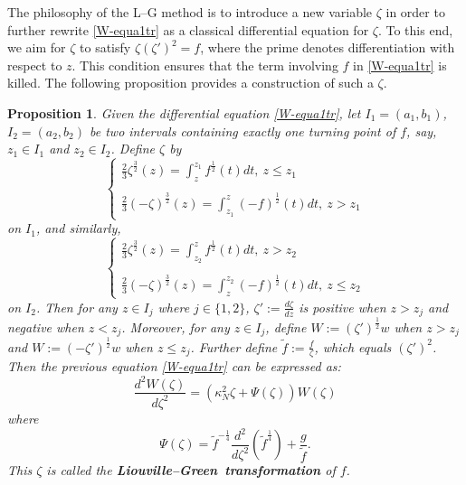 \documentclass[11pt]{article}
\newtheorem{proposition}[theorem]{Proposition}
\numberwithin{equation}{section}%
\numberwithin{theorem}{section}
\begin{document}
The philosophy of the L--G method is to introduce a new variable $\zeta$ in order to further rewrite \eqref{W-equa1tr} as a classical differential equation for $\zeta$. To this end, we aim for $\zeta$ to satisfy $\zeta(\zeta')^2=f$, where the prime denotes differentiation with respect to $z$. This condition ensures that the term involving $f$ in \eqref{W-equa1tr} is killed. The following proposition provides a construction of such a $\zeta$.
\begin{proposition}\label{L-G Trans}
   Given the differential equation \eqref{W-equa1tr}, let $I_1=(a_1,b_1)$, $I_2=(a_2,b_2)$ be two intervals containing exactly one turning point of $f$, say, $z_1\in I_1$ and $z_2\in I_2$. Define $\zeta$ by
\begin{equation}\label{LG1}
\left\{
\begin{array}{ll}
  \frac{2}{3}\zeta^{\frac{3}{2}}(z)= \int_{z}^{z_1}f^{\frac{1}{2}}(t)dt,~z\le z_1\\\\
  \frac{2}{3}(-\zeta)^\frac{3}{2}(z)=\int_{z_1}^z(-f)^\frac{1}{2}(t)dt,~z>z_1
\end{array}
 \right. 
\end{equation}
on $I_1$, and similarly,
\begin{equation}\label{LG2}
\left\{
\begin{array}{ll}
  \frac{2}{3}\zeta^{\frac{3}{2}}(z)= \int_{z_2}^{z}f^{\frac{1}{2}}(t)dt,~z>z_2\\\\
  \frac{2}{3}(-\zeta)^\frac{3}{2}(z)=\int_{z}^{z_2}(-f)^\frac{1}{2}(t)dt,~z\le z_2
\end{array}
 \right. 
\end{equation}
on $I_2$. Then for any $z\in I_j$ where $j\in\{1,2\}$, $\zeta':=\frac{d\zeta}{dz}$ is positive when $z>z_j$ and negative when $z<z_j$. Moreover, for any $z\in I_j$, define $W:=(\zeta')^{\frac{1}{2}}w$ when $z>z_j$ and $W:=(-\zeta')^\frac{1}{2}w$ when $z\le z_j$. Further define $\tilde{f}:=\frac{f}{\zeta}$, which equals $(\zeta')^2$. Then the previous equation \eqref{W-equa1tr} can be expressed as:
\begin{equation}\label{W-equa2}
    \frac{d^2W(\zeta)}{d\zeta^2}=\left(\kappa_N^2\zeta+\Psi(\zeta)\right)W(\zeta)
\end{equation}
where
\begin{equation*}
  \Psi(\zeta)=\tilde{f}^{-\frac{1}{4}}\frac{d^2}{d\zeta^2}\left(\tilde{f}^{\frac{1}{4}}\right)+\frac{g}{\tilde{f}}.
\end{equation*}
This $\zeta$ is called the \textbf{Liouville--Green~transformation} of $f$.
\end{proposition}
\end{document}
